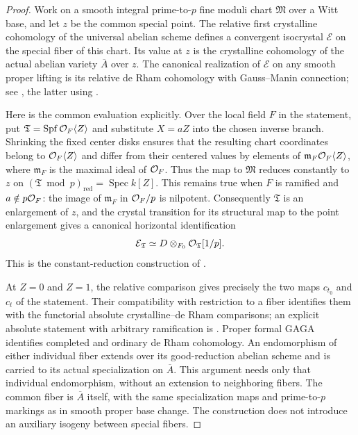 \begin{proof}
Work on a smooth integral prime-to-$p$ fine moduli chart
$\mathfrak M$ over a Witt base, and let $z$ be the common
special point.  The relative first crystalline cohomology of
the universal abelian scheme defines a convergent isocrystal
$\mathcal E$ on the special fiber of this chart.  Its value
at $z$ is the crystalline cohomology of the actual abelian
variety $\overline A$ over $z$.  The canonical realization of
$\mathcal E$ on any smooth proper lifting is its relative
de Rham cohomology with Gauss--Manin connection; see
\cite[Theorems~4.16 and~4.26]{MaulikPoonen2012}, the latter
using \cite[Theorem~3.8.2]{Ogus1984}.

Here is the common evaluation explicitly.  Over the local
field $F$ in the statement, put
$\mathfrak T=\operatorname{Spf}\mathcal O_F\langle Z\rangle$
and substitute $X=aZ$ into the chosen inverse branch.  Shrinking the
fixed center disks ensures that the resulting chart coordinates belong
to $\mathcal O_F\langle Z\rangle$ and differ from their centered values by
elements of $\mathfrak m_F\mathcal O_F\langle Z\rangle$, where
$\mathfrak m_F$ is the maximal ideal of $\mathcal O_F$.  Thus the map to
$\mathfrak M$ reduces constantly to $z$ on
$(\mathfrak T\bmod p)_{\mathrm{red}}=\operatorname{Spec}k[Z]$.
This remains true when $F$ is ramified and $a\notin p\mathcal O_F$:
the image of $\mathfrak m_F$ in $\mathcal O_F/p$ is nilpotent.
Consequently $\mathfrak T$ is an enlargement of $z$, and
the crystal transition for its structural map to the point
enlargement gives a canonical horizontal identification
\[
 \mathcal E_{\mathfrak T}
   \simeq D\otimes_{F_0}\mathcal O_{\mathfrak T}[1/p].
\]
This is the constant-reduction construction of
\cite[Definitions~4.10--4.13 and Section~4.7]{MaulikPoonen2012}.

At $Z=0$ and $Z=1$, the relative comparison gives precisely
the two maps $c_{t_0}$ and $c_t$ of the statement.  Their
compatibility with restriction to a fiber identifies them
with the functorial absolute crystalline--de Rham
comparisons; an explicit absolute statement with arbitrary
ramification is
\cite[Appendix~B, Proposition~B.4]{KubrakPrikhodko2022}.
Proper formal GAGA identifies completed and ordinary
de Rham cohomology.  An endomorphism of either individual
fiber extends over its good-reduction abelian scheme and
is carried to its actual specialization on $\overline A$.
This argument needs only that individual endomorphism,
without an extension to neighboring fibers.  The common
fiber is $\overline A$ itself, with the same specialization
maps and prime-to-$p$ markings as in smooth proper base
change.  The construction does not introduce an auxiliary
isogeny between special fibers.


\end{proof}
